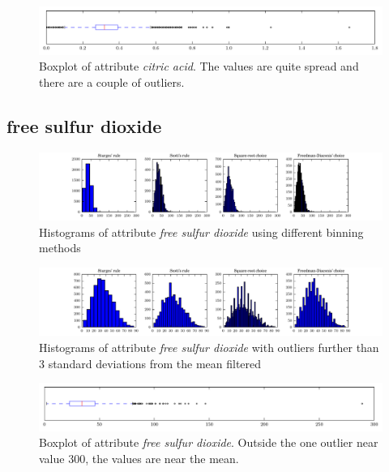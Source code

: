 \documentclass{report}
\begin{document}
\begin{figure}[H]
\includegraphics[width=\textwidth]{boxplots/citric_acid.pdf}
\caption{Boxplot of attribute \emph{citric acid}. The values are quite spread and there are a couple of outliers.}\end{figure}

\newpage
\subsection{free sulfur dioxide}
\begin{figure}[H]
\includegraphics[width=\textwidth]{histograms/free_sulfur_dioxide.pdf}
\caption{Histograms of attribute \emph{free sulfur dioxide} using different binning methods}\end{figure}

\begin{figure}[H]
\includegraphics[width=\textwidth]{histograms/free_sulfur_dioxide_filtered.pdf}
\caption{Histograms of attribute \emph{free sulfur dioxide} with outliers further than 3 standard deviations from the mean filtered}
\end{figure}

\begin{figure}[H]
\includegraphics[width=\textwidth]{boxplots/free_sulfur_dioxide.pdf}
\caption{Boxplot of attribute \emph{free sulfur dioxide}. Outside the one outlier near value 300, the values are near the mean.}\end{figure}
\end{document}
